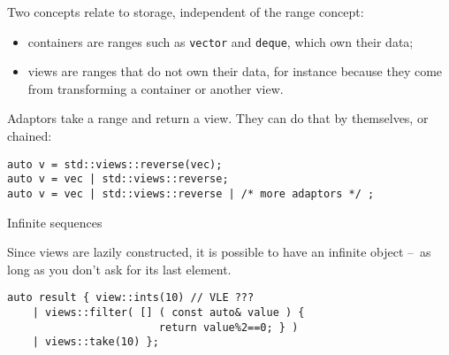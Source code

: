 Two concepts relate to storage, independent of the range concept:
\begin{itemize}
\item containers are ranges such as  \lstinline{vector} and \lstinline{deque},
  which own their data;
\item views are ranges that do not own their data, for instance
  because they come from transforming a container or another view.
\end{itemize}

Adaptors take a range and return a view. They can do that by themselves, or chained:
\begin{lstlisting}
auto v = std::views::reverse(vec);
auto v = vec | std::views::reverse;
auto v = vec | std::views::reverse | /* more adaptors */ ;
\end{lstlisting}

 {Infinite sequences}

Since views are lazily constructed,
it is possible to have an infinite object
--~as long as you don't ask for its last element.
\begin{lstlisting}
auto result { view::ints(10) // VLE ???
    | views::filter( [] ( const auto& value ) {
                        return value%2==0; } )
    | views::take(10) };
\end{lstlisting}
